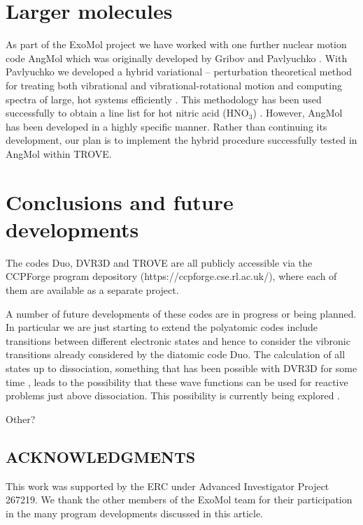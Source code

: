 \documentclass[12pt]{article}
\newcommand{\2}{$_{2}$}
\newcommand{\3}{$_{3}$}
\newcommand{\4}{$_{4}$}
\begin{document}
\section{Larger molecules}



As part of the ExoMol project we have worked with one further nuclear motion code
{\sc AngMol} which was originally developed by Gribov and Pavlyuchko \cite{88GrPa.method}.
With Pavlyuchko we developed a hybrid variational -- perturbation theoretical method for
treating both vibrational and vibrational-rotational motion \cite{jt588} and  computing
spectra of large, hot systems efficiently \cite{jt603}. This methodology has been used
successfully to obtain a  line list for hot nitric acid (HNO$_3$) \cite{jt614}.
However, {\sc AngMol} has been developed in a highly specific manner. Rather than continuing
its development, our plan is to implement the hybrid procedure successfully tested in
{\sc AngMol} within {\sc TROVE}.


\section{Conclusions and future developments}

The codes {\sc Duo}, {\sc DVR3D} and {\sc TROVE} are all publicly
accessible via the CCPForge program depository
(https://ccpforge.cse.rl.ac.uk/), where each of them are available as
a separate project.

A number of future developments of these codes are in progress or
being planned. In particular we are just starting to extend the polyatomic
codes include transitions between different electronic states and hence
to consider the vibronic transitions already considered by the diatomic
code {\sc Duo}. The calculation of all states up to dissociation,
something that has been possible with  {\sc DVR3D} for some time
\cite{jt100,jt132,jt230}, leads to the possibility that these wave functions
can be used for reactive problems just above dissociation. This possibility
is currently being explored \cite{jtfaraday}.

Other?





\subsection*{ACKNOWLEDGMENTS}
This work was supported by the ERC under Advanced Investigator Project 267219.
We thank the other members of the ExoMol team for their participation
in the many program developments discussed in this article.


\end{document}
